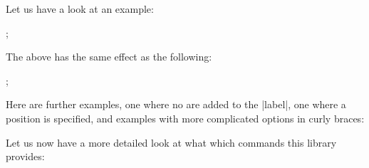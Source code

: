 Let us have a look at an example:
\begin{codeexample}[]
\tikz {};
\end{codeexample}
The above has the same effect as the following:
\begin{codeexample}[]
\tikz {};
\end{codeexample}

Here are further examples, one where no  are added
to the |label|, one where a position is specified, and examples with
more complicated options in curly braces:

\begin{codeexample}[]
\end{codeexample}

Let us now have a more detailed look at what which commands this
library provides:

